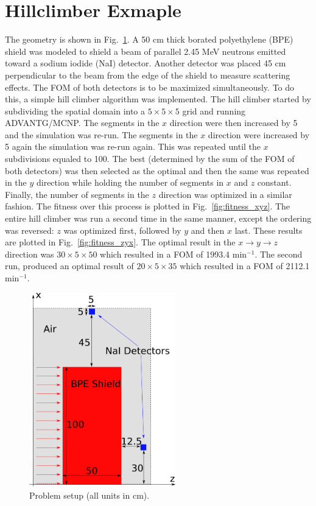\documentclass[conference]{IEEEtran}
\begin{document}
\section{Hillclimber Exmaple}
The geometry is shown in Fig.~\ref{fig:probsetup}. A 50 cm thick borated polyethylene (BPE) shield was modeled to shield a beam of parallel 2.45 MeV neutrons emitted toward a sodium iodide (NaI) detector. Another detector was placed 45 cm perpendicular to the beam from the edge of the shield to measure scattering effects. The FOM of both detectors is to be maximized simultaneously. To do this, a simple hill climber algorithm was implemented. The hill climber started by subdividing the spatial domain into a $5 \times 5 \times 5$ grid and running ADVANTG/MCNP. The segments in the $x$ direction were then increased by 5 and the simulation was re-run. The segments in the $x$ direction were increased by 5 again the simulation was re-run again. This was repeated until the $x$ subdivisions equaled to 100. The best (determined by the sum of the FOM of both detectors) was then selected as the optimal and then the same was repeated in the $y$ direction while holding the number of segments in $x$ and $z$ constant. Finally, the number of segments in the $z$ direction was optimized in a similar fashion. The fitness over this process is plotted in Fig.~\ref{fig:fitness_xyz}. The entire hill climber was run a second time in the same manner, except the ordering was reversed: $z$ was optimized first, followed by $y$ and then $x$ last. These results are plotted in Fig.~\ref{fig:fitness_zyx}. The optimal result in the $x \rightarrow y \rightarrow z$ direction was $30 \times 5 \times 50$ which resulted in a FOM of 1993.4 min$^{-1}$. The second run, produced an optimal result of $20 \times 5 \times 35$ which resulted in a FOM of 2112.1 min$^{-1}$.
\begin{figure}[!t]
  \centering
  \includegraphics[width=2.5in]{probsetup}
  \caption{Problem setup (all units in cm).}
  \label{fig:probsetup}
\end{figure}
\end{document}
